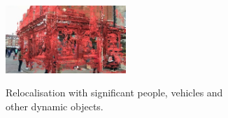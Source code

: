 \begin{figure}[p]
\begin{center}
\begin{subfigure}[t]{0.28\textwidth}
{   	\includegraphics[width=0.5\textwidth]{ICCV/seq1frame00008pngoverlay}
   	}
   \caption{Relocalisation with significant people, vehicles and other dynamic objects.}
\end{subfigure}
\qquad
\begin{subfigure}[t]{0.28\textwidth}
\end{subfigure}
\end{center}
\end{figure}
